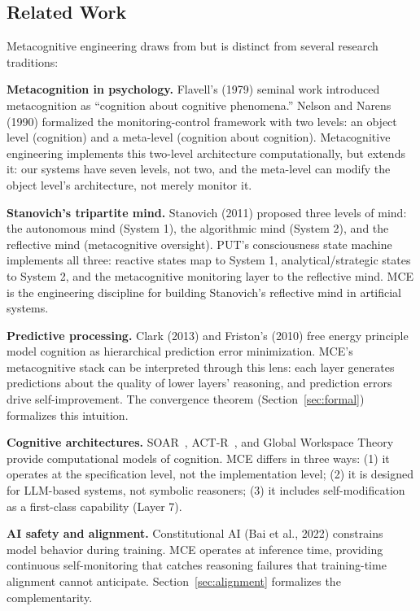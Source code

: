 \documentclass[12pt,a4paper]{article}
\theoremstyle{plain}
\theoremstyle{definition}
\theoremstyle{remark}
\begin{document}
\subsection{Related Work}

Metacognitive engineering draws from but is distinct from several research traditions:

\textbf{Metacognition in psychology.} Flavell's (1979) seminal work introduced metacognition as ``cognition about cognitive phenomena.'' Nelson and Narens (1990) formalized the monitoring-control framework with two levels: an object level (cognition) and a meta-level (cognition about cognition). Metacognitive engineering implements this two-level architecture computationally, but extends it: our systems have seven levels, not two, and the meta-level can modify the object level's architecture, not merely monitor it.

\textbf{Stanovich's tripartite mind.} Stanovich (2011) proposed three levels of mind: the autonomous mind (System 1), the algorithmic mind (System 2), and the reflective mind (metacognitive oversight). PUT's consciousness state machine implements all three: reactive states map to System 1, analytical/strategic states to System 2, and the metacognitive monitoring layer to the reflective mind. MCE is the engineering discipline for building Stanovich's reflective mind in artificial systems.

\textbf{Predictive processing.} Clark (2013) and Friston's (2010) free energy principle model cognition as hierarchical prediction error minimization. MCE's metacognitive stack can be interpreted through this lens: each layer generates predictions about the quality of lower layers' reasoning, and prediction errors drive self-improvement. The convergence theorem (Section~\ref{sec:formal}) formalizes this intuition.

\textbf{Cognitive architectures.} SOAR~\cite{laird2012}, ACT-R~\cite{anderson2007}, and Global Workspace Theory~\cite{baars1988} provide computational models of cognition. MCE differs in three ways: (1) it operates at the specification level, not the implementation level; (2) it is designed for LLM-based systems, not symbolic reasoners; (3) it includes self-modification as a first-class capability (Layer 7).

\textbf{AI safety and alignment.} Constitutional AI (Bai et al., 2022) constrains model behavior during training. MCE operates at inference time, providing continuous self-monitoring that catches reasoning failures that training-time alignment cannot anticipate. Section~\ref{sec:alignment} formalizes the complementarity.
\end{document}
